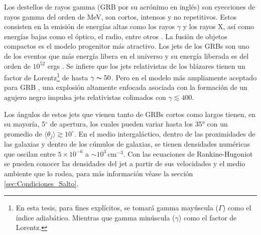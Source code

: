 \documentclass[12pt,a4paper]{book}
\begin{document}
Los destellos de rayos gamma (GRB por su acrónimo en inglés) son eyecciones de rayos gamma del orden de MeV, son cortos, intensos y no repetitivos.
Estos consisten en la emisión de energías altas como los rayos $\gamma$ y los rayos X, así como energías bajas como el óptico, el radio, entre otros \citep{PGRB-piran, Zhang:PGRB}. %
La fusión de objetos compactos es el modelo progenitor más atractivo.
Los jets de los  GRBs son uno de los eventos que más energía libera en el universo y su energía liberada es del orden de $10^{52}$ ergs \citep{Berger:2014jza}.
Se infiere que los jets relativistas de los blázares tienen un factor de Lorentz\footnote{En esta tesis,
para fines explícitos, se tomará gamma mayúscula ($\Gamma$) como el índice adiabático. Mientras que 
gamma minúscula ($\gamma$) como el factor de Lorentz.} de hasta $\gamma \thicksim 50$. 
Pero en el modelo más ampliamente aceptado para GRB \citep{Seo2021}, una explosión altamente enfocada asociada con la formación de un agujero negro impulsa jets relativistas colimados con $\gamma \lesssim 400$. 

Los ángulos de estos jets que vienen tanto de GRBs cortos como largos tienen, en su mayoría, 5$^{\circ}$ de apertura, los cuales pueden variar hasta los 35° con un promedio de $\langle \theta_j \rangle \gtrsim 10^{\circ}$.
En el medio intergaláctico, dentro de las proximidades de las galaxias y dentro de los cúmulos de galaxias, se tienen densidades numéricas que oscilan entre $5 \times 10^{-6}$ a 
$ \sim 10^3 \, \text{cm}^{-3}$. Con las ecuaciones de Rankine-Hugoniot se pueden conocer las densidades del jet a partir de sus velocidades y el medio ambiente que lo rodea, para más información 
véase la sección \ref{sec:Condiciones_Salto}.
\end{document}
